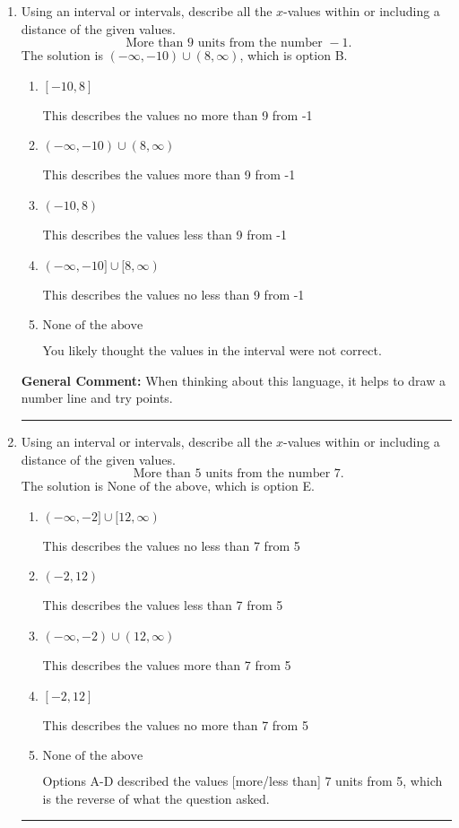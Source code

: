 \documentclass{extbook}[14pt]
\newcommand{\litem}[1]{\item #1

\rule{\textwidth}{0.4pt}}
\begin{document}
\begin{enumerate}\litem{
Using an interval or intervals, describe all the $x$-values within or including a distance of the given values.
\[ \text{ More than } 9 \text{ units from the number } -1. \]The solution is \( (-\infty, -10) \cup (8, \infty) \), which is option B.\begin{enumerate}[label=\Alph*.]
\item \( [-10, 8] \)

This describes the values no more than 9 from -1
\item \( (-\infty, -10) \cup (8, \infty) \)

This describes the values more than 9 from -1
\item \( (-10, 8) \)

This describes the values less than 9 from -1
\item \( (-\infty, -10] \cup [8, \infty) \)

This describes the values no less than 9 from -1
\item \( \text{None of the above} \)

You likely thought the values in the interval were not correct.
\end{enumerate}

\textbf{General Comment:} When thinking about this language, it helps to draw a number line and try points.
}
\litem{
Using an interval or intervals, describe all the $x$-values within or including a distance of the given values.
\[ \text{ More than } 5 \text{ units from the number } 7. \]The solution is \( \text{None of the above} \), which is option E.\begin{enumerate}[label=\Alph*.]
\item \( (-\infty, -2] \cup [12, \infty) \)

This describes the values no less than 7 from 5
\item \( (-2, 12) \)

This describes the values less than 7 from 5
\item \( (-\infty, -2) \cup (12, \infty) \)

This describes the values more than 7 from 5
\item \( [-2, 12] \)

This describes the values no more than 7 from 5
\item \( \text{None of the above} \)

Options A-D described the values [more/less than] 7 units from 5, which is the reverse of what the question asked.
\end{enumerate}

}
\end{enumerate}
\end{document}
